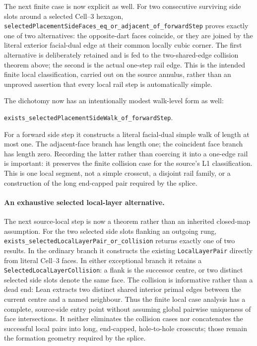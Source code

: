 \documentclass[11pt]{article}
\theoremstyle{definition}
\begin{document}
The next finite case is now explicit as well.  For two consecutive surviving
side slots around a selected Cell--3 hexagon,
\texttt{selectedPlacementSideFaces\_eq\_or\_adjacent\_of\_forwardStep}
proves exactly one of two alternatives: the opposite-dart faces coincide, or
they are joined by the literal exterior facial-dual edge at their common
locally cubic corner.  The first alternative is deliberately retained and is
fed to the two-shared-edge collision theorem above; the second is the actual
one-step rail edge.  This is the intended finite local classification, carried
out on the source annulus, rather than an unproved assertion that every local
rail step is automatically simple.

The dichotomy now has an intentionally modest walk-level form as well:

\begin{center}
\texttt{exists\_selectedPlacementSideWalk\_of\_forwardStep}.
\end{center}

For a forward side step it constructs a literal facial-dual simple walk of
length at most one.  The adjacent-face branch has length one; the coincident
face branch has length zero.  Recording the latter rather than coercing it
into a one-edge rail is important: it preserves the finite collision case for
the source's L1 classification.  This is one local segment, not a simple
crosscut, a disjoint rail family, or a construction of the long end-capped
pair required by the splice.

\paragraph{An exhaustive selected local-layer alternative.}  The next
source-local step is now a theorem rather than an inherited closed-map
assumption.  For the two selected side slots flanking an outgoing rung,
\texttt{exists\_selectedLocalLayerPair\_or\_collision} returns exactly one
of two results.  In the ordinary branch it constructs the existing
\texttt{LocalLayerPair} directly from literal Cell--3 faces.  In either
exceptional branch it retains a \texttt{SelectedLocalLayerCollision}: a flank
is the successor centre, or two distinct selected side slots denote the same
face.  The collision is informative rather than a dead end: Lean extracts two
distinct shared interior primal edges between the current centre and a named
neighbour.  Thus the finite local case analysis has a complete, source-side
entry point without assuming global pairwise uniqueness of face intersections.
It neither eliminates the collision cases nor concatenates the successful
local pairs into long, end-capped, hole-to-hole crosscuts; those remain the
formation geometry required by the splice.
\end{document}
